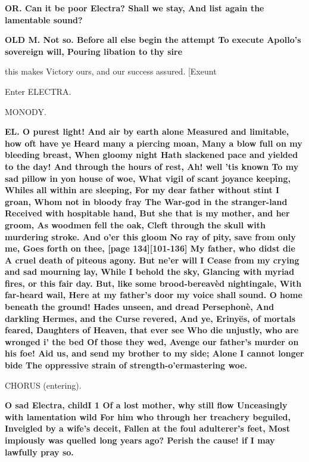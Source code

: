 \documentclass[11pt,letter]{book}
\begin{document}
\par \textbf{OR. Can it be poor Electra? Shall we stay, And list again the lamentable sound?}
\par 

\par \textbf{OLD M. Not so. Before all else begin the attempt To execute Apollo’s sovereign will, Pouring libation to thy sire}
\par   this makes Victory ours, and our success assured. [Exeunt

\par  Enter ELECTRA.

\par  MONODY.

\par \textbf{EL. O purest light! And air by earth alone Measured and limitable, how oft have ye Heard many a piercing moan, Many a blow full on my bleeding breast, When gloomy night Hath slackened pace and yielded to the day! And through the hours of rest, Ah! well ’tis known To my sad pillow in yon house of woe, What vigil of scant joyance keeping, Whiles all within are sleeping, For my dear father without stint I groan, Whom not in bloody fray The War-god in the stranger-land Received with hospitable hand, But she that is my mother, and her groom, As woodmen fell the oak, Cleft through the skull with murdering stroke. And o’er this gloom No ray of pity, save from only me, Goes forth on thee, [page 134][101-136] My father, who didst die A cruel death of piteous agony. But ne’er will I Cease from my crying and sad mourning lay, While I behold the sky, Glancing with myriad fires, or this fair day. But, like some brood-bereavèd nightingale, With far-heard wail, Here at my father’s door my voice shall sound. O home beneath the ground! Hades unseen, and dread Persephonè, And darkling Hermes, and the Curse revered, And ye, Erinyës, of mortals feared, Daughters of Heaven, that ever see Who die unjustly, who are wronged i’ the bed Of those they wed, Avenge our father’s murder on his foe! Aid us, and send my brother to my side; Alone I cannot longer bide The oppressive strain of strength-o’ermastering woe.}
\par 

\par  CHORUS (entering).

\par \textbf{O sad Electra, childI 1 Of a lost mother, why still flow Unceasingly with lamentation wild For him who through her treachery beguiled, Inveigled by a wife’s deceit, Fallen at the foul adulterer’s feet, Most impiously was quelled long years ago? Perish the cause! if I may lawfully pray so.}
\par 
\end{document}
